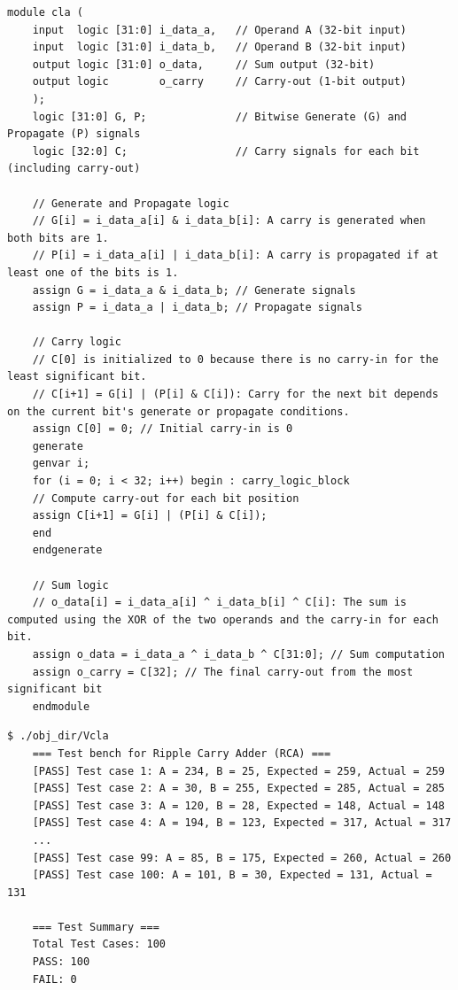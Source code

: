 \begin{lstlisting}[style = SystemVerilog, caption={CLA}]
	module cla (
	input  logic [31:0] i_data_a,   // Operand A (32-bit input)
	input  logic [31:0] i_data_b,   // Operand B (32-bit input)
	output logic [31:0] o_data,     // Sum output (32-bit)
	output logic        o_carry     // Carry-out (1-bit output)
	);
	logic [31:0] G, P;              // Bitwise Generate (G) and Propagate (P) signals
	logic [32:0] C;                 // Carry signals for each bit (including carry-out)
	
	// Generate and Propagate logic
	// G[i] = i_data_a[i] & i_data_b[i]: A carry is generated when both bits are 1.
	// P[i] = i_data_a[i] | i_data_b[i]: A carry is propagated if at least one of the bits is 1.
	assign G = i_data_a & i_data_b; // Generate signals
	assign P = i_data_a | i_data_b; // Propagate signals
	
	// Carry logic
	// C[0] is initialized to 0 because there is no carry-in for the least significant bit.
	// C[i+1] = G[i] | (P[i] & C[i]): Carry for the next bit depends on the current bit's generate or propagate conditions.
	assign C[0] = 0; // Initial carry-in is 0
	generate
	genvar i;
	for (i = 0; i < 32; i++) begin : carry_logic_block
	// Compute carry-out for each bit position
	assign C[i+1] = G[i] | (P[i] & C[i]);
	end
	endgenerate
	
	// Sum logic
	// o_data[i] = i_data_a[i] ^ i_data_b[i] ^ C[i]: The sum is computed using the XOR of the two operands and the carry-in for each bit.
	assign o_data = i_data_a ^ i_data_b ^ C[31:0]; // Sum computation
	assign o_carry = C[32]; // The final carry-out from the most significant bit
	endmodule
\end{lstlisting}

\begin{lstlisting}[style=C, caption={Kết quả test}]
	$ ./obj_dir/Vcla 
	=== Test bench for Ripple Carry Adder (RCA) ===
	[PASS] Test case 1: A = 234, B = 25, Expected = 259, Actual = 259
	[PASS] Test case 2: A = 30, B = 255, Expected = 285, Actual = 285
	[PASS] Test case 3: A = 120, B = 28, Expected = 148, Actual = 148
	[PASS] Test case 4: A = 194, B = 123, Expected = 317, Actual = 317
	...
	[PASS] Test case 99: A = 85, B = 175, Expected = 260, Actual = 260
	[PASS] Test case 100: A = 101, B = 30, Expected = 131, Actual = 131
	
	=== Test Summary ===
	Total Test Cases: 100
	PASS: 100
	FAIL: 0
\end{lstlisting}